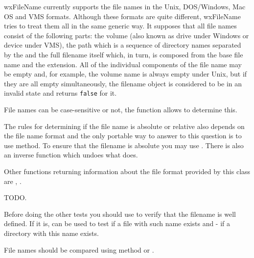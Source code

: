 wxFileName currently supports the file names in the Unix, DOS/Windows, Mac OS
and VMS formats. Although these formats are quite different, wxFileName tries
to treat them all in the same generic way. It supposes that all file names
consist of the following parts: the volume (also known as drive under Windows
or device under VMS), the path which is a sequence of directory names separated
by the  and the full
filename itself which, in turn, is composed from the base file name and the
extension. All of the individual components of the file name may be empty and,
for example, the volume name is always empty under Unix, but if they are all
empty simultaneously, the filename object is considered to be in an invalid
state and  returns {\tt false} for it.

File names can be case-sensitive or not, the function\rtfsp
{} allows to determine this.

The rules for determining if the file name is absolute or relative also depends
on the file name format and the only portable way to answer to this question is
to use  method. To ensure that the
filename is absolute you may use .
There is also an inverse function 
 which undoes what
 does.

Other functions returning information about the file format provided by this
class are ,\rtfsp
{}.




TODO.



Before doing the other tests you should use  to
verify that the filename is well defined. If it is, 
 can be used to test if a file with
such name exists and  - if a directory
with this name exists.

File names should be compared using  method
or .


